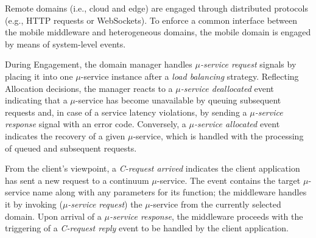 Remote domains (i.e., cloud and edge) are engaged through distributed protocols (e.g., HTTP requests or WebSockets). To enforce a common interface between the mobile middleware and heterogeneous domains, the mobile domain is engaged by means of system-level events.

During Engagement, the domain manager handles \textit{$\mu$-service request} signals by placing it into one $\mu$-service instance after a \textit{load balancing} strategy. Reflecting Allocation decisions, the manager reacts to a \textit{$\mu$-service deallocated} event 
indicating that a $\mu$-service has become unavailable 
by queuing subsequent requests and, in case of a service latency violations, by sending a \textit{$\mu$-service response} signal with an error code. Conversely, a \textit{$\mu$-service allocated} event indicates the recovery of a given $\mu$-service, which is handled with the processing of queued and subsequent requests. 


%
%		
%		
%		

From the client's viewpoint, a \textit{C-request arrived} indicates the client application has sent a new request to a continuum $\mu$-service. The event contains the target $\mu$-service name along with any parameters for its function; the middleware handles it by invoking (\textit{$\mu$-service request}) the $\mu$-service from the currently selected domain. Upon arrival of a \textit{$\mu$-service response}, the middleware proceeds with the triggering of a \textit{C-request reply} event to be handled by the client application.  

